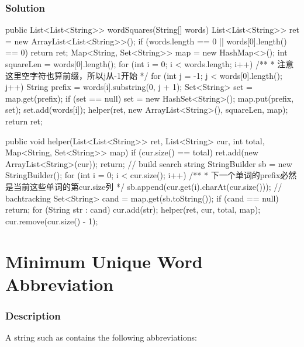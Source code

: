 \subsubsection{Solution}
\begin{Code}
public List<List<String>> wordSquares(String[] words) {
    List<List<String>> ret = new ArrayList<List<String>>();
    if (words.length == 0 || words[0].length() == 0) {
        return ret;
    }
    Map<String, Set<String>> map = new HashMap<>();
    int squareLen = words[0].length();
    for (int i = 0; i < words.length; i++) {
        /**
         * 注意这里空字符也算前缀，所以j从-1开始
         */
        for (int j = -1; j < words[0].length(); j++) {
            String prefix = words[i].substring(0, j + 1);
            Set<String> set = map.get(prefix);
            if (set == null) {
                set = new HashSet<String>();
                map.put(prefix, set);
            }
            set.add(words[i]);
        }
    }
    helper(ret, new ArrayList<String>(), squareLen, map);
    return ret;
}

public void helper(List<List<String>> ret, List<String> cur, int total, Map<String, Set<String>> map) {
    if (cur.size() == total) {
        ret.add(new ArrayList<String>(cur));
        return;
    }
    // build search string
    StringBuilder sb = new StringBuilder();
    for (int i = 0; i < cur.size(); i++) {
        /**
         * 下一个单词的prefix必然是当前这些单词的第cur.size列
         */
        sb.append(cur.get(i).charAt(cur.size()));
    }
    // bachtracking
    Set<String> cand = map.get(sb.toString());
    if (cand == null) {
        return;
    }
    for (String str : cand) {
        cur.add(str);
        helper(ret, cur, total, map);
        cur.remove(cur.size() - 1);
    }
}
\end{Code}

\newpage

\section{Minimum Unique Word Abbreviation} %

\subsubsection{Description}
A string such as  contains the following abbreviations:


